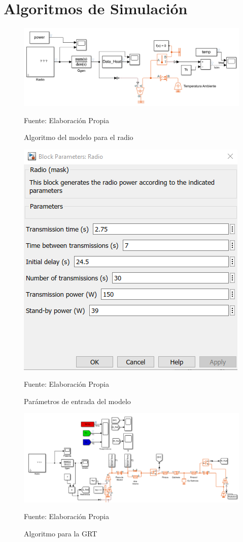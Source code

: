 
\chapter{Algoritmos de Simulación}


\begin{figure}[H]
\centering
\includegraphics[scale=0.5]{Figuras/modelo_radio.png}
\caption{Algoritmo del modelo para el radio}
\centering
Fuente: Elaboración Propia
\label{anexo7}
\end{figure}

\begin{figure}[H]
\centering
\includegraphics[scale=0.7]{Figuras/parametros_resultado.png}
\caption{Parámetros de entrada del modelo}
Fuente: Elaboración Propia
\label{anexo8}
\end{figure}


\begin{figure}[H]
\centering
\includegraphics[width=\linewidth]{Figuras/Algoritmo_GTR.png} %
\caption{Algoritmo para la GRT}
Fuente: Elaboración Propia
\label{anexo10}
\end{figure}

